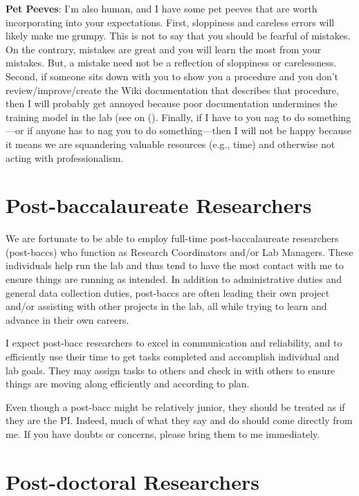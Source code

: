 \documentclass[letterpaper,11pt,oneside]{memoir}
\begin{document}
\noindent \textbf{Pet Peeves}: I'm also human, and I have some pet peeves that are worth incorporating into your expectations. First, sloppiness and careless errors will likely make me grumpy. This is not to say that you should be fearful of mistakes. On the contrary, mistakes are great and you will learn the most from your mistakes. But, a mistake need not be a reflection of sloppiness or carelessness. Second, if someone sits down with you to show you a procedure and you don't review/improve/create the Wiki documentation that describes that procedure, then I will probably get annoyed because poor documentation undermines the training model in the lab (see  on (). Finally, if I have to you nag to do something---or if anyone has to nag you to do something---then I will not be happy because it means we are squandering valuable resources (e.g., time) and otherwise not acting with professionalism.


\section{Post-baccalaureate Researchers}

We are fortunate to be able to employ full-time post-baccalaureate researchers (post-baccs) who function as Research Coordinators and/or Lab Managers. These individuals help run the lab and thus tend to have the most contact with me to ensure things are running as intended. In addition to administrative duties and general data collection duties, post-baccs are often leading their own project and/or assisting with other projects in the lab, all while trying to learn and advance in their own careers. 

I expect post-bacc researchers to excel in communication and reliability, and to efficiently use their time to get tasks completed and accomplish individual and lab goals. They may assign tasks to others and check in with others to ensure things are moving along efficiently and according to plan.


\begin{shaded}
\noindent Even though a post-bacc might be relatively junior, they should be treated as if they are the PI. Indeed, much of what they say and do should come directly from me. If you have doubts or concerns, please bring them to me immediately.  
\end{shaded}


\section{Post-doctoral Researchers}
\end{document}

